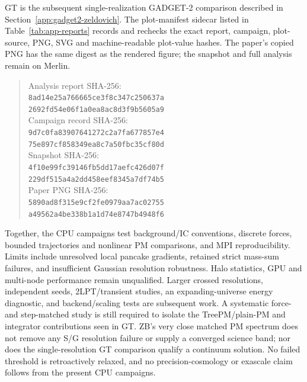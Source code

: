 GT is the subsequent single-realization GADGET-2 comparison described in
Section~\ref{app:gadget2-zeldovich}.  The plot-manifest sidecar listed in
Table~\ref{tab:app-reports} records and rechecks the exact report, campaign,
plot-source, PNG, SVG and machine-readable plot-value hashes.  The paper's
copied PNG has the same digest as the rendered figure; the snapshot and full
analysis remain on Merlin.
\begin{quote}\small
Analysis report SHA-256:\\
\texttt{8ad14e25a766665ce3f8c347c250637a}\\
\texttt{2692fd54e06f1a0ea8ac8d3f9b5605a9}\\
Campaign record SHA-256:\\
\texttt{9d7c0fa83907641272c2a7fa677857e4}\\
\texttt{75e897cf858349ea8c7a50fbc35cf80d}\\
Snapshot SHA-256:\\
\texttt{4f10e99fc39146fb5dd17aefc426d07f}\\
\texttt{229df515a4a2dd458eef8345a7df74b5}\\
Paper PNG SHA-256:\\
\texttt{5890ad8f315e9cf2fe0979aa7ac02755}\\
\texttt{a49562a4be338b1a1d74e8747b4948f6}
\end{quote}

Together, the CPU campaigns test background/IC conventions, discrete forces,
bounded trajectories and nonlinear PM comparisons, and MPI reproducibility.
Limits include unresolved local pancake gradients, retained strict mass-sum
failures, and insufficient Gaussian resolution robustness.  Halo statistics,
GPU and multi-node performance remain unqualified.  Larger crossed resolutions,
independent seeds, 2LPT/transient studies, an expanding-universe energy diagnostic,
and backend/scaling tests are subsequent work.  A systematic force- and
step-matched study is still required to isolate the TreePM/plain-PM and
integrator contributions seen in GT.  ZB's very close matched PM spectrum
does not remove any S/G resolution failure or supply a converged science band;
nor does the single-resolution GT comparison qualify a continuum solution.
No failed threshold is retroactively relaxed, and no precision-cosmology or
exascale claim follows from the present CPU campaigns.
